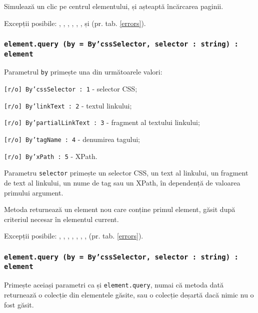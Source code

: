 Simulează un clic pe centrul elementului, și așteaptă încărcarea paginii.

Excepții posibile: , , , , , ,  și  (pr. tab. \ref{errors}).

\subsubsection{\texttt{element.query (by = By'cssSelector, selector : string) : element}}

Parametrul \texttt{by} primește una din următoarele valori:
\begin{icItems}
    \item \texttt{[r/o] By'cssSelector : 1} - selector CSS;
	\item \texttt{[r/o] By'linkText : 2} - textul linkului;
	\item \texttt{[r/o] By'partialLinkText : 3} - fragment al textului linkului;
	\item \texttt{[r/o] By'tagName : 4} - denumirea tagului;
	\item \texttt{[r/o] By'xPath : 5} - XPath.
\end{icItems}

Parametru \texttt{selector} primește un selector CSS, un text al linkului, un fragment de text al linkului, un nume de tag sau un XPath, în dependență de valoarea primului argument.

Metoda returnează un element nou care conține primul element, găsit după criteriul necesar în elementul current.

Excepții posibile: , , , , , , ,  (pr. tab. \ref{errors}).

\subsubsection{\texttt{element.query (by = By'cssSelector, selector : string) : element}}

Primește aceiași parametri ca și \texttt{element.query}, numai că metoda dată returnează o colecție din elementele găsite, sau o colecție deșartă dacă nimic nu o fost găsit.

